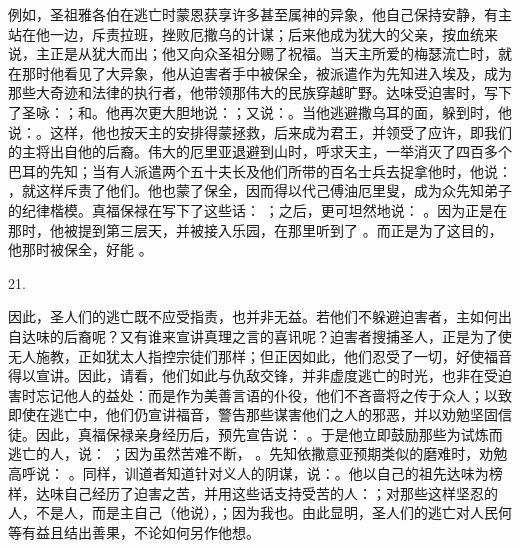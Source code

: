 例如，圣祖雅各伯在逃亡时蒙恩获享许多甚至属神的异象，他自己保持安静，有主站在他一边，斥责拉班，挫败厄撒乌的计谋；后来他成为犹大的父亲，按血统来说，主正是从犹大而出；他又向众圣祖分赐了祝福。当天主所爱的梅瑟流亡时，就在那时他看见了大异象，他从迫害者手中被保全，被派遣作为先知进入埃及，成为那些大奇迹和法律的执行者，他带领那伟大的民族穿越旷野。达味受迫害时，写下了圣咏：；和。他再次更大胆地说：；又说：。当他逃避撒乌耳的面，躲到时，他说：。这样，他也按天主的安排得蒙拯救，后来成为君王，并领受了应许，即我们的主将出自他的后裔。伟大的厄里亚退避到山时，呼求天主，一举消灭了四百多个巴耳的先知；当有人派遣两个五十夫长及他们所带的百名士兵去捉拿他时，他说： ，就这样斥责了他们。他也蒙了保全，因而得以代己傅油厄里叟，成为众先知弟子的纪律楷模。真福保禄在写下了这些话： ；之后，更可坦然地说： 。因为正是在那时，他被提到第三层天，并被接入乐园，在那里听到了 。而正是为了这目的，他那时被保全，好能 。\par

21. \par

因此，圣人们的逃亡既不应受指责，也并非无益。若他们不躲避迫害者，主如何出自达味的后裔呢？又有谁来宣讲真理之言的喜讯呢？迫害者搜捕圣人，正是为了使无人施教，正如犹太人指控宗徒们那样；但正因如此，他们忍受了一切，好使福音得以宣讲。因此，请看，他们如此与仇敌交锋，并非虚度逃亡的时光，也非在受迫害时忘记他人的益处：而是作为美善言语的仆役，他们不吝啬将之传于众人；以致即使在逃亡中，他们仍宣讲福音，警告那些谋害他们之人的邪恶，并以劝勉坚固信徒。因此，真福保禄亲身经历后，预先宣告说： 。于是他立即鼓励那些为试炼而逃亡的人，说： ；因为虽然苦难不断， 。先知依撒意亚预期类似的磨难时，劝勉高呼说： 。同样，训道者知道针对义人的阴谋，说：。他以自己的祖先达味为榜样，达味自己经历了迫害之苦，并用这些话支持受苦的人：；对那些这样坚忍的人，不是人，而是主自己（他说），；因为我也。由此显明，圣人们的逃亡对人民何等有益且结出善果，不论如何另作他想。\par

